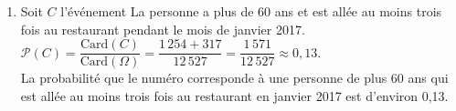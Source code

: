 \begin{enumerate}
\begin{enumerate}
               {\blue La probabilité que le numéro corresponde à une personne qui a moins de 45 ans est d'environ 0,52}. \\
            \item Soit $C$ l'événement  \og La personne a plus de 60 ans et est allée au moins trois fois au restaurant pendant le mois de janvier 2017\fg{}. \\ [1mm]
               $\mathcal{P}(C) =\dfrac{\textrm{Card}(C)}{\textrm{Card}(\Omega)} =\dfrac{1\,254+317}{12\,527} =\dfrac{1\,571}{12\,527} \approx 0,13.$ \\ [1mm]
               {\blue La probabilité que le numéro corresponde à une personne de plus 60 ans qui est allée au moins trois fois au restaurant en janvier 2017 est d'environ 0,13}.
         \end{enumerate}
   \end{enumerate}
